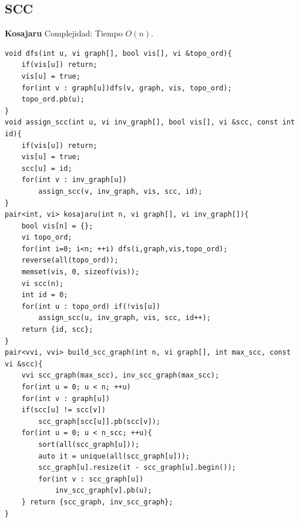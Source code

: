 \subsection{SCC}
\textbf{Kosajaru}
Complejidad: Tiempo $O(n)$.
\begin{verbatim}
void dfs(int u, vi graph[], bool vis[], vi &topo_ord){
    if(vis[u]) return;
    vis[u] = true;
    for(int v : graph[u])dfs(v, graph, vis, topo_ord);
    topo_ord.pb(u);
}
void assign_scc(int u, vi inv_graph[], bool vis[], vi &scc, const int id){
    if(vis[u]) return;
    vis[u] = true;
    scc[u] = id;
    for(int v : inv_graph[u])
        assign_scc(v, inv_graph, vis, scc, id);
}
pair<int, vi> kosajaru(int n, vi graph[], vi inv_graph[]){
    bool vis[n] = {};
    vi topo_ord;
    for(int i=0; i<n; ++i) dfs(i,graph,vis,topo_ord);
    reverse(all(topo_ord));
    memset(vis, 0, sizeof(vis));
    vi scc(n);
    int id = 0;
    for(int u : topo_ord) if(!vis[u])
        assign_scc(u, inv_graph, vis, scc, id++);
    return {id, scc};
}
pair<vvi, vvi> build_scc_graph(int n, vi graph[], int max_scc, const vi &scc){
    vvi scc_graph(max_scc), inv_scc_graph(max_scc);
    for(int u = 0; u < n; ++u)
    for(int v : graph[u])
    if(scc[u] != scc[v])
        scc_graph[scc[u]].pb(scc[v]);
    for(int u = 0; u < n_scc; ++u){
        sort(all(scc_graph[u]));
        auto it = unique(all(scc_graph[u]));
        scc_graph[u].resize(it - scc_graph[u].begin());
        for(int v : scc_graph[u])
            inv_scc_graph[v].pb(u);
    } return {scc_graph, inv_scc_graph};
}
\end{verbatim}



